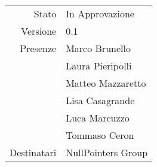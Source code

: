 \begin{center}
\begin{tabular}{r|l}
	Stato & In Approvazione \\
	Versione & 0.1 \\
	Presenze & Marco Brunello \\
	         & Laura Pieripolli \\
	         & Matteo Mazzaretto \\
	         & Lisa Casagrande \\
	         & Luca Marcuzzo \\
	         & Tommaso Ceron \\
	Destinatari & NullPointers Group \\
\end{tabular}
\end{center}